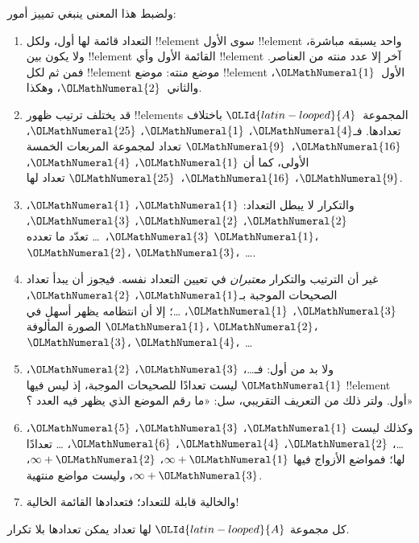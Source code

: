 \documentclass[../../../include/open-logic-section]{subfiles}
\begin{document}
\begin{explain}
ولضبط هذا المعنى ينبغي تمييز أمور:
\begin{enumerate}
\item التعداد قائمة لها أول، ولكل !!{element} سوى الأول
!!{element} واحد يسبقه مباشرة، ولا يكون بين !!{element} القائمة
الأول وأي !!{element} آخر إلا عدد منته من العناصر. فمن ثم لكل
!!{element} موضع منته: موضع !!{element} الأول~${\OLMathNumeral{1}}$، والثاني~${\OLMathNumeral{2}}$، وهكذا.
\item قد يختلف ترتيب ظهور !!{element}s المجموعة~${\OLId{latin-looped}{A}}$ باختلاف تعدادها.
فـ${\OLMathNumeral{4}}$، ${\OLMathNumeral{1}}$، ${\OLMathNumeral{25}}$، ${\OLMathNumeral{16}}$،~${\OLMathNumeral{9}}$ تعداد لمجموعة المربعات الخمسة الأولى،
كما أن ${\OLMathNumeral{1}}$، ${\OLMathNumeral{4}}$، ${\OLMathNumeral{9}}$، ${\OLMathNumeral{16}}$،~${\OLMathNumeral{25}}$ تعداد لها.
\item والتكرار لا يبطل التعداد: ${\OLMathNumeral{1}}$، ${\OLMathNumeral{1}}$، ${\OLMathNumeral{2}}$، ${\OLMathNumeral{2}}$، ${\OLMathNumeral{3}}$، ${\OLMathNumeral{3}}$،~\dots{}
تعدّد ما تعدده ${\OLMathNumeral{1}}$، ${\OLMathNumeral{2}}$، ${\OLMathNumeral{3}}$،~\dots{}.
\item غير أن الترتيب والتكرار \emph{معتبران} في تعيين التعداد نفسه.
فيجوز أن يبدأ تعداد الصحيحات الموجبة بـ${\OLMathNumeral{1}}$، ${\OLMathNumeral{2}}$، ${\OLMathNumeral{3}}$، ${\OLMathNumeral{1}}$، \dots{}؛
إلا أن انتظامه يظهر أسهل في الصورة المألوفة ${\OLMathNumeral{1}}$، ${\OLMathNumeral{2}}$، ${\OLMathNumeral{3}}$، ${\OLMathNumeral{4}}$،~\dots
\item ولا بد من أول: فـ\dots، ${\OLMathNumeral{3}}$، ${\OLMathNumeral{2}}$، ${\OLMathNumeral{1}}$ ليست تعدادًا للصحيحات
الموجبة، إذ ليس فيها !!{element} أول. ولتر ذلك من التعريف التقريبي،
سل: «ما رقم الموضع الذي يظهر فيه العدد ؟»
\item وكذلك ليست ${\OLMathNumeral{1}}$، ${\OLMathNumeral{3}}$، ${\OLMathNumeral{5}}$، \dots، ${\OLMathNumeral{2}}$، ${\OLMathNumeral{4}}$، ${\OLMathNumeral{6}}$، \dots\@
تعدادًا لها؛ فمواضع الأزواج فيها $\infty + {\OLMathNumeral{1}}$، $\infty + {\OLMathNumeral{2}}$، $\infty +
{\OLMathNumeral{3}}$، وليست مواضع منتهية.
\item والخالية قابلة للتعداد؛ فتعدادها القائمة الخالية!{}
\end{enumerate}
\end{explain}

\begin{prop}
كل مجموعة ${\OLId{latin-looped}{A}}$ لها تعداد يمكن تعدادها بلا تكرار.
\end{prop}
\end{document}
